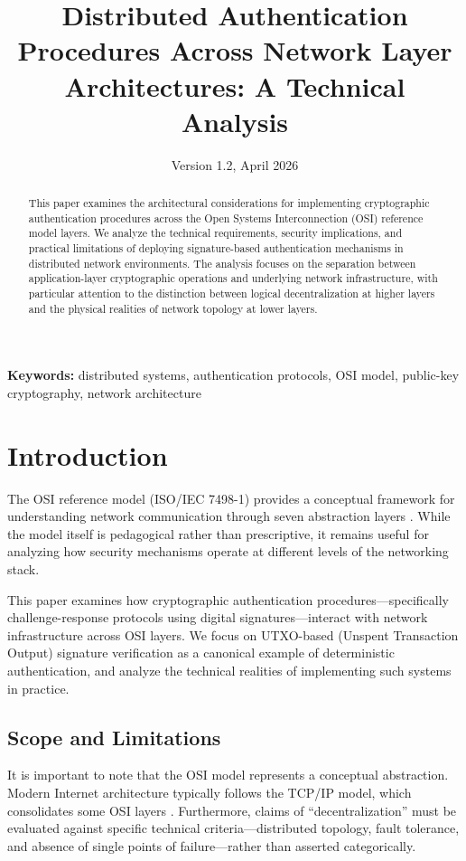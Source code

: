 \documentclass[11pt,a4paper]{article}
\title{\bfseries Distributed Authentication Procedures Across Network Layer Architectures: A Technical Analysis}
\author{}
\date{Version 1.2, April 2026}
\begin{document}
\maketitle

\begin{abstract}
\noindent
This paper examines the architectural considerations for implementing cryptographic authentication procedures across the Open Systems Interconnection (OSI) reference model layers. We analyze the technical requirements, security implications, and practical limitations of deploying signature-based authentication mechanisms in distributed network environments. The analysis focuses on the separation between application-layer cryptographic operations and underlying network infrastructure, with particular attention to the distinction between logical decentralization at higher layers and the physical realities of network topology at lower layers.
\end{abstract}

\vspace{0.5cm}
\noindent\textbf{Keywords:} distributed systems, authentication protocols, OSI model, public-key cryptography, network architecture

\section{Introduction}

The OSI reference model (ISO/IEC 7498-1) provides a conceptual framework for understanding network communication through seven abstraction layers \citep{iso1994}. While the model itself is pedagogical rather than prescriptive, it remains useful for analyzing how security mechanisms operate at different levels of the networking stack.

This paper examines how cryptographic authentication procedures---specifically challenge-response protocols using digital signatures---interact with network infrastructure across OSI layers. We focus on UTXO-based (Unspent Transaction Output) signature verification as a canonical example of deterministic authentication, and analyze the technical realities of implementing such systems in practice.

\subsection{Scope and Limitations}

It is important to note that the OSI model represents a conceptual abstraction. Modern Internet architecture typically follows the TCP/IP model, which consolidates some OSI layers \citep{cerf1974}. Furthermore, claims of ``decentralization'' must be evaluated against specific technical criteria---distributed topology, fault tolerance, and absence of single points of failure---rather than asserted categorically.
\end{document}
